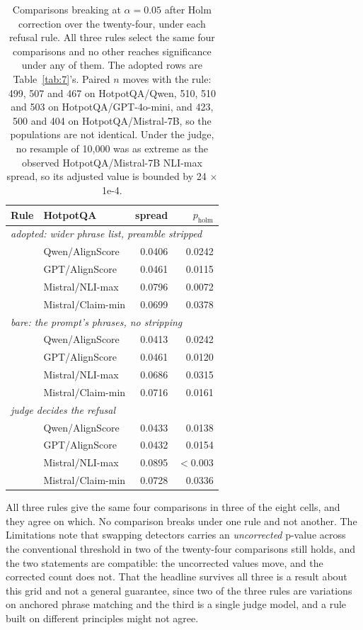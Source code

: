 \documentclass[11pt]{article}
\begin{document}
\begin{table}[t]
\centering\small
\begin{tabular}{llrr}
\toprule
\textbf{Rule} & \textbf{HotpotQA} & spread & $p_{\mathrm{holm}}$ \\
\midrule
\multicolumn{4}{l}{\emph{adopted: wider phrase list, preamble stripped}} \\
 & Qwen/AlignScore & 0.0406 & 0.0242 \\
 & GPT/AlignScore & 0.0461 & 0.0115 \\
 & Mistral/NLI-max & 0.0796 & 0.0072 \\
 & Mistral/Claim-min & 0.0699 & 0.0378 \\
\midrule
\multicolumn{4}{l}{\emph{bare: the prompt's phrases, no stripping}} \\
 & Qwen/AlignScore & 0.0413 & 0.0242 \\
 & GPT/AlignScore & 0.0461 & 0.0120 \\
 & Mistral/NLI-max & 0.0686 & 0.0315 \\
 & Mistral/Claim-min & 0.0716 & 0.0161 \\
\midrule
\multicolumn{4}{l}{\emph{judge decides the refusal}} \\
 & Qwen/AlignScore & 0.0433 & 0.0138 \\
 & GPT/AlignScore & 0.0432 & 0.0154 \\
 & Mistral/NLI-max & 0.0895 & $<$0.003 \\
 & Mistral/Claim-min & 0.0728 & 0.0336 \\
\bottomrule
\end{tabular}
\caption{Comparisons breaking at $\alpha = 0.05$ after Holm correction over the twenty-four, under each refusal rule. All three rules select the same four comparisons and no other reaches significance under any of them. The adopted rows are Table~\ref{tab:7}'s. Paired $n$ moves with the rule: 499, 507 and 467 on HotpotQA/Qwen, 510, 510 and 503 on HotpotQA/GPT-4o-mini, and 423, 500 and 404 on HotpotQA/Mistral-7B, so the populations are not identical. Under the judge, no resample of 10,000 was as extreme as the observed HotpotQA/Mistral-7B NLI-max spread, so its adjusted value is bounded by 24 $\times$ 1e-4.}
\label{tab:refusalrule}
\end{table}

All three rules give the same four comparisons in three of the eight cells, and they agree on which. No comparison breaks under one rule and not another. The Limitations note that swapping detectors carries an \emph{uncorrected} p-value across the conventional threshold in two of the twenty-four comparisons still holds, and the two statements are compatible: the uncorrected values move, and the corrected count does not. That the headline survives all three is a result about this grid and not a general guarantee, since two of the three rules are variations on anchored phrase matching and the third is a single judge model, and a rule built on different principles might not agree.
\end{document}
